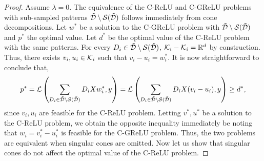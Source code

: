 \coneElimination*
\begin{proof}
    Assume \( \lambda = 0 \).
    The equivalence of the C-ReLU and C-GReLU problems with sub-sampled
    patterns \( \tilde {\mathcal{D}} \setminus \mathcal{S}(\tilde{\mathcal{D}}) \) follows
    immediately from cone decompositions.
    Let \( w^* \) be a solution to the C-GReLU problem with
    \( \tilde {\mathcal{D}} \setminus \mathcal{S}(\tilde{\mathcal{D}}) \)
    and \( p^* \) the optimal value.
    Let \( d^* \) be the optimal value of the C-ReLU problem with the same
    patterns.
    For every \( D_i \in \tilde {\mathcal{D}} \setminus \mathcal{S}(\tilde{\mathcal{D}}) \),
    \( \mathcal{K}_i - \mathcal{K}_i = \mathbb{R}^d \) by construction.
    Thus, there exists \( v_i, u_i \in \mathcal{K}_i \) such that
    \( v_i - u_i = w_i^* \).
    It is now straightforward to conclude that,
    \[
        p^* =
        \mathcal{L}\left(\sum_{D_i \in \tilde {\mathcal{D}} \setminus \mathcal{S}(\tilde{\mathcal{D}})}
            D_i X w_i^*, y\right)
        =
        \mathcal{L}\left(\sum_{D_i \in \tilde {\mathcal{D}} \setminus \mathcal{S}(\tilde{\mathcal{D}})}
            D_i X (v_i - u_i), y\right)
        \geq d^*,
    \]
    since \( v_i, u_i \) are feasible for the C-ReLU problem.
    Letting \( v^*, u^* \) be a solution to the C-ReLU problem,
    we obtain the opposite inequality immediately be noting that
    \( w_i = v^*_i - u^*_i \) is feasible for the C-GReLU problem.
    Thus, the two problems are equivalent when singular cones are omitted.
    Now let us show that singular cones do not affect the optimal value
    of the C-ReLU problem.


\end{proof}
